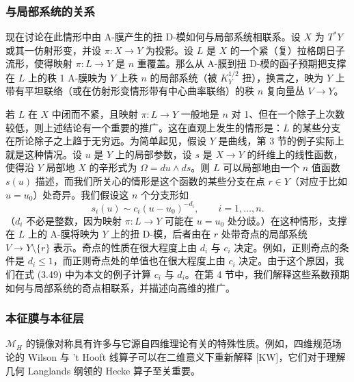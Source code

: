 \subsubsection{与局部系统的关系}

现在讨论在此情形中由 A-膜产生的扭 D-模如何与局部系统相联系。设 $X$ 为 $T^*Y$ 或其一仿射形变，并设 $\pi:X\to Y$ 为投影。设 $L$ 是 $X$ 的一个紧（复）拉格朗日子流形，使得映射 $\pi:L\to Y$ 是 $n$ 重覆盖。那么从 A-膜到扭 D-模的函子预期把支撑在 $L$ 上的秩 1 A-膜映为 $Y$ 上秩 $n$ 的局部系统（被 $K_Y^{1/2}$ 扭），换言之，映为 $Y$ 上带有平坦联络（或在仿射形变情形带有中心曲率联络）的秩 $n$ 复向量丛 $V\to Y$。


若 $L$ 在 $X$ 中闭而不紧，且映射 $\pi:L\to Y$ 一般地是 $n$ 对 1、但在一个除子上次数较低，则上述结论有一个重要的推广。这在直观上发生的情形是：$L$ 的某些分支在所论除子之上趋于无穷远。为简单起见，假设 $Y$ 是曲线，第 3 节的例子实际上就是这种情况。设 $u$ 是 $Y$ 上的局部参数，设 $s$ 是 $X\to Y$ 的纤维上的线性函数，使得沿 $Y$ 局部地 $X$ 的辛形式为 $\Omega=du\wedge ds$。则 $L$ 可以局部地由一个 $n$ 值函数 $s(u)$ 描述，而我们所关心的情形是这个函数的某些分支在点 $r\in Y$（对应于比如 $u=u_0$）处奇异。我们假设这 $n$ 个分支形如
\begin{equation}\tag{2.6}
s_i(u)\sim c_i(u-u_0)^{-d_i},\qquad i=1,\dots,n.
\end{equation}
（$d_i$ 不必是整数，因为映射 $\pi:L\to Y$ 可能在 $u=u_0$ 处分歧。）在这种情形，支撑在 $L$ 上的 A-膜将映为 $Y$ 上的扭 D-模，后者由在 $r$ 处带奇点的局部系统 $V\to Y\setminus\{r\}$ 表示。奇点的性质在很大程度上由 $d_i$ 与 $c_i$ 决定。例如，正则奇点的条件是 $d_i\le 1$，而正则奇点处的单值也在很大程度上由 $c_i$ 决定。由于这个原因，我们在式 (3.49) 中为本文的例子计算 $c_i$ 与 $d_i$。在第 4 节中，我们解释这些系数预期如何与局部系统的奇点相联系，并描述向高维的推广。

\subsubsection{本征膜与本征层}

$\mathcal{M}_H$ 的镜像对称具有许多与它源自四维理论有关的特殊性质。例如，四维规范场论的 Wilson 与 't Hooft 线算子可以在二维意义下重新解释 [KW]，它们对于理解几何 Langlands 纲领的 Hecke 算子至关重要。

